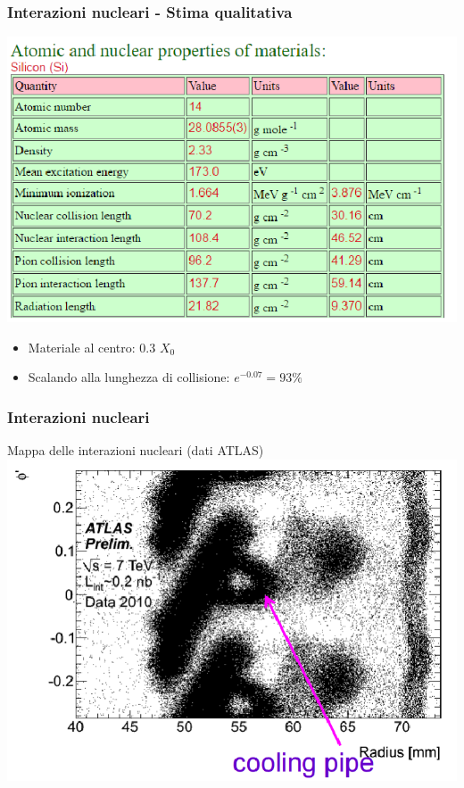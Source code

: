\documentclass{beamer}
\begin{document}
\begin{frame}
\frametitle{Interazioni nucleari - Stima qualitativa}
\includegraphics[width=.7\textwidth]{silicio}
\begin{itemize}
\item Materiale al centro: 0.3 $X_{0}$
\item Scalando alla lunghezza di collisione: $e^{-0.07} = 93\%$
\end{itemize}
\end{frame}



\begin{frame}
\frametitle{Interazioni nucleari}
\centering
Mappa delle interazioni nucleari (dati ATLAS)
\includegraphics[width=.8\textwidth]{Tracking/radiografia}

\end{frame}

\end{document}
